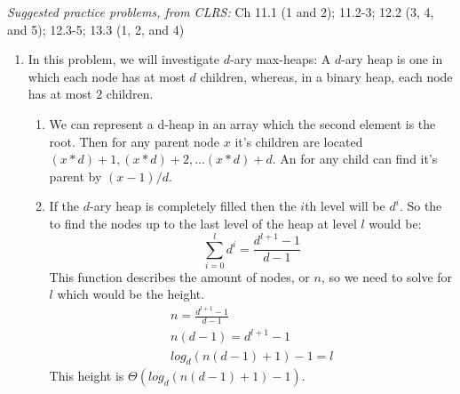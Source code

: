 \documentclass{article}
\begin{document}




\emph{Suggested practice problems, from CLRS:} Ch 11.1 (1 and 2); 11.2-3; 12.2 (3, 4, and 5); 12.3-5; 13.3 (1, 2, and 4) 

\begin{enumerate}

\item In this problem, we will investigate $d$-ary max-heaps: A $d$-ary heap is one in which each node has at most $d$ children, whereas, in a binary heap, each node has at most $2$ children.

\begin{enumerate}
\item 
We can represent a d-heap in an array which the second element is the root. Then for any parent node $x$ it's children are located $(x*d)+1,(x*d)+2,...(x*d)+d$. An for any child can find it's parent by  $(x-1)/d$.

\item 
If the $d$-ary heap is completely filled then the $i$th level will be $d^i$. So the to find the nodes up to the last level of the heap at level $l$ would be: 
\begin{equation}
\sum_{i=0}^{l} d^i = \frac{d^{l+1}-1}{d-1} 
\end{equation}
This function describes the amount of nodes, or $n$, so we need to solve for $l$ which would be the height.
\begin{equation}
 \begin{aligned}
    n = \frac{d^{l+1}-1}{d-1} \\
    n(d-1) = d^{l+1}-1 \\
   log_d (n(d-1)+1)-1 = l           
  \end{aligned} 
\end{equation}
This height is $\Theta(log_d (n(d-1)+1)-1)$.


\end{enumerate}
\end{enumerate}
\end{document}

